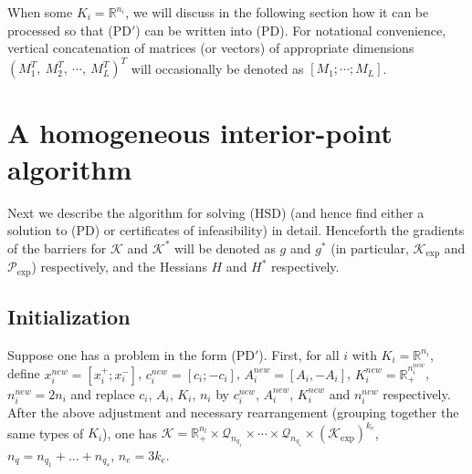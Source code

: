 \documentclass[10pt]{article}
\theoremstyle{definition}
\theoremstyle{plain}
\begin{document}
When some $K_i = \mathbb{R}^{n_i}$, we will discuss in the following section how it can be processed so that (PD$'$) can be written into (PD). For notational convenience, vertical concatenation of matrices (or vectors) of appropriate dimensions $(M_1^T,\ M_2^T,\ \cdots,\ M_L^T)^T$ will occasionally be denoted as $[M_1; \cdots ; M_L]$.

\section{A homogeneous interior-point algorithm}
Next we describe the algorithm for solving (HSD) (and hence find either a solution to (PD) or certificates of infeasibility) in detail. Henceforth the gradients of the barriers for $\mathcal{K}$ and $\mathcal{K}^*$ will be denoted as $g$ and $g^*$ (in particular, $\mathcal{K}_{\exp}$ and $\mathcal{P}_{\exp}$) respectively, and the Hessians $H$ and $H^*$ respectively.
\subsection{Initialization}

Suppose one has a problem in the form (PD$'$). First, for all $i$ with $K_i = \mathbb{R}^{n_i}$, define $x_i^{new} = [x_i^+; x_i^-]$, $c_i^{new} = [c_i; -c_i]$, $A_i^{new} = [A_i, -A_i]$, $K_i^{new} = \mathbb{R}_+^{n_i^{new}}$, $n_i^{new} = 2n_i$ and replace $c_i$, $A_i$, $K_i$, $n_i$ by $c_i^{new}$, $A_i^{new}$, $K_i^{new}$ and $n_i^{new}$ respectively. After the above adjustment and necessary rearrangement (grouping together the same types of $K_i$), one has $\mathcal{K} = \mathbb{R}_+^{n_l} \times \mathcal{Q}_{n_{q_1}} \times \cdots \times \mathcal{Q}_{n_{q_s}} \times \left(\mathcal{K}_{\exp}\right)^{k_e}$, $n_q = n_{q_1} + ... + n_{q_s}$, $n_e = 3k_e$. \\
	
\end{document}
